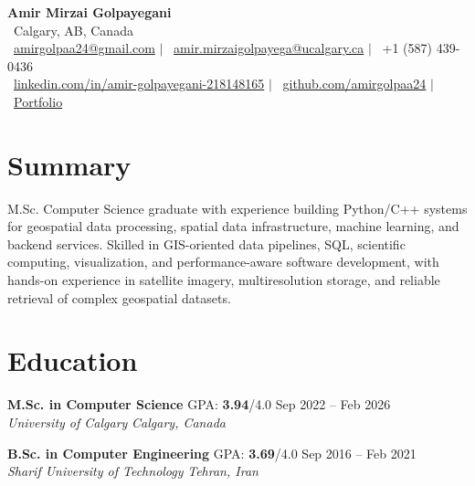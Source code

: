 \documentclass[a4paper,10pt]{article}
\newcommand{\resumeEducationSubheading}[5]{
    \textbf{#1} \hfill #2 \hfill #3 \\
    \textit{#4} \hfill \textit{#5}
}
\begin{document}

\begin{center}
    {\LARGE \textbf{Amir Mirzai Golpayegani}} \\[0.25em]
    \faMapMarker*~Calgary, AB, Canada \\[0.25em]
    \faEnvelope~\href{mailto:amirgolpaa24@gmail.com}{amirgolpaa24@gmail.com}
    $|$
    \faEnvelope~\href{mailto:amir.mirzaigolpayega@ucalgary.ca}{amir.mirzaigolpayega@ucalgary.ca}
    $|$
    \faPhone*~+1 (587) 439-0436 \\[0.25em]
    \faLinkedin~\href{https://linkedin.com/in/amir-golpayegani-218148165}{linkedin.com/in/amir-golpayegani-218148165}
    $|$
    \faGithub~\href{https://github.com/amirgolpaa24}{github.com/amirgolpaa24}
    $|$
    \faGlobe~\href{https://amir-portfolio-navy.vercel.app/}{Portfolio}
\end{center}


\section*{Summary}

M.Sc. Computer Science graduate with experience building Python/C++ systems for geospatial data processing, spatial data infrastructure, machine learning, and backend services. Skilled in GIS-oriented data pipelines, SQL, scientific computing, visualization, and performance-aware software development, with hands-on experience in satellite imagery, multiresolution storage, and reliable retrieval of complex geospatial datasets.


\section*{Education}

\resumeEducationSubheading
{M.Sc. in Computer Science}
{GPA: \textbf{3.94}/4.0}
{Sep 2022 -- Feb 2026}
{University of Calgary}
{Calgary, Canada}

\vspace{0.35em}

\resumeEducationSubheading
{B.Sc. in Computer Engineering}
{GPA: \textbf{3.69}/4.0}
{Sep 2016 -- Feb 2021}
{Sharif University of Technology}
{Tehran, Iran}

\end{document}
